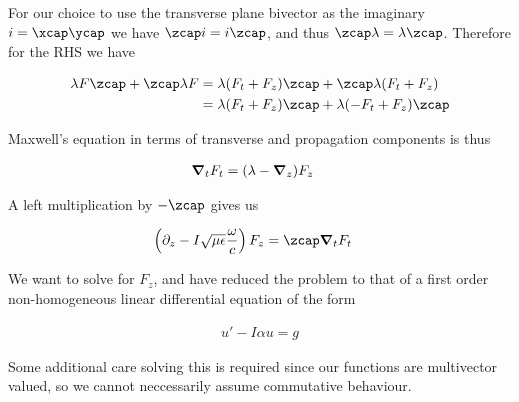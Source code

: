 For our choice to use the transverse plane bivector as the imaginary $i = \xcap\ycap$ we have $\zcap i = i \zcap$, and thus $\zcap \lambda = \lambda \zcap$.  Therefore for the RHS we have

\begin{align*}
\lambda F \zcap + \zcap \lambda F 
&=
\lambda (F_t + F_z) \zcap + \zcap \lambda (F_t + F_z) \\
&=
\lambda (F_t + F_z) \zcap + \lambda (-F_t + F_z) \zcap \\
\end{align*}

Maxwell's equation in terms of transverse and propagation components is thus

\begin{align}\label{eqn:foo6}
\boldsymbol{\nabla}_t F_t &= (\lambda -\boldsymbol{\nabla}_z) F_z
\end{align}

A left multiplication by $-\zcap$ gives us

\begin{align}\label{eqn:foo7}
\left(\partial_z - I\sqrt{\mu\epsilon}\frac{\omega}{c} \right) F_z &= \zcap \spacegrad_t F_t 
\end{align}

We want to solve for $F_z$, and have reduced the problem to that of a first order non-homogeneous linear differential equation of the form

\begin{align}\label{eqn:foo8}
u' - I \alpha u = g
\end{align}

Some additional care solving this is required since our functions are multivector valued, so we cannot neccessarily assume commutative behaviour.

\EndArticle
